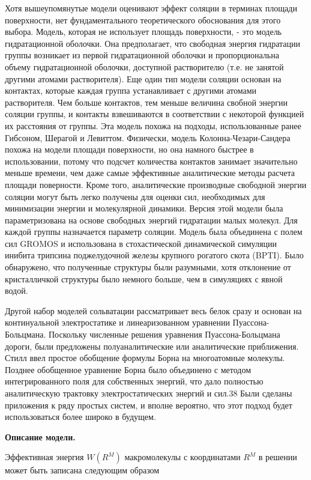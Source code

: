 Хотя вышеупомянутые модели оценивают эффект соляции в терминах площади поверхности, нет фундаментального теоретического обоснования для этого выбора. Модель, которая не использует площадь поверхности, - это модель гидратационной оболочки. Она предполагает, что свободная энергия гидратации группы возникает из первой гидратационной оболочки и пропорциональна объему гидратационной оболочки, доступной растворителю (т.е. не занятой другими атомами растворителя). Еще один тип модели соляции основан на контактах, которые каждая группа устанавливает с другими атомами растворителя. Чем больше контактов, тем меньше величина свобной энергии соляции группы, и контакты взвешиваются в соответствии с некоторой функцией их расстояния от группы. Эта модель похожа на подходы, использованные ранее Гибсоном, Шерагой и Левиттом. Физически, модель Колонна-Чезари-Сандера похожа на модели площади поверхности, но она намного быстрее в использовании, потому что подсчет количества контактов занимает значительно меньше времени, чем даже самые эффективные аналитические методы расчета площади поверности. Кроме того, аналитические производные свободной энергии соляции могут быть легко получены для оценки сил, необходимых для минимизации энергии и молекулярной динамики. Версия этой модели была параметризована на основе свободных энергий гидратации малых молекул. Для каждой группы назначается параметр соляции. Модель была объединена с полем сил GROMOS и использована в стохастической динамической симуляции инибита трипсина поджелудочной железы крупного рогатого скота (BPTI). Было обнаружено, что полученные структуры были разумными, хотя отклонение от кристалличкой структуры было немного больше, чем в симуляциях с явной водой. 

Другой набор моделей сольватации рассматривает весь белок сразу и основан на континуальной электростатике и линеаризованном уравнении Пуассона-Больцмана. Поскольку численные решения уравнения Пуассона-Больцмана дороги, были предложены полуаналитические или аналитические приближения. Стилл ввел простое обобщение формулы Борна на многоатомные молекулы. Позднее обобщенное уравнение Борна было объединено с методом интегрированного поля для собственных энергий, что дало полностью аналитическую трактовку электростатических энергий и сил.38 Были сделаны приложения к ряду простых систем, и вполне вероятно, что этот подход будет использоваться более широко в будущем.

\textbf{Описание модели.}

Эффективная энергия $W(R^M)$ макромолекулы с координатами $R^M$ в решении может быть записана следующим образом

